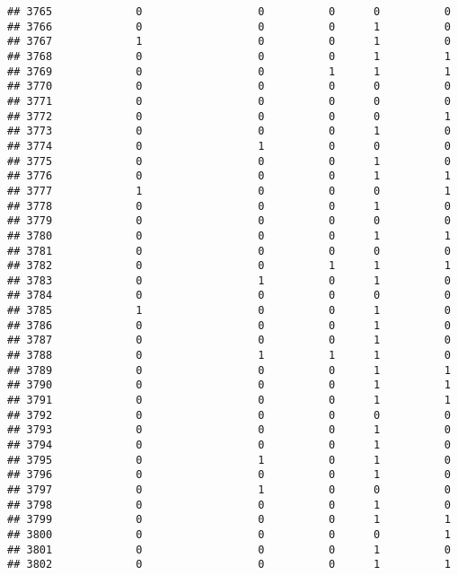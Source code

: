 \documentclass[
]{article}
\begin{document}
\begin{verbatim}
## 3765             0                  0          0      0          0
## 3766             0                  0          0      1          0
## 3767             1                  0          0      1          0
## 3768             0                  0          0      1          1
## 3769             0                  0          1      1          1
## 3770             0                  0          0      0          0
## 3771             0                  0          0      0          0
## 3772             0                  0          0      0          1
## 3773             0                  0          0      1          0
## 3774             0                  1          0      0          0
## 3775             0                  0          0      1          0
## 3776             0                  0          0      1          1
## 3777             1                  0          0      0          1
## 3778             0                  0          0      1          0
## 3779             0                  0          0      0          0
## 3780             0                  0          0      1          1
## 3781             0                  0          0      0          0
## 3782             0                  0          1      1          1
## 3783             0                  1          0      1          0
## 3784             0                  0          0      0          0
## 3785             1                  0          0      1          0
## 3786             0                  0          0      1          0
## 3787             0                  0          0      1          0
## 3788             0                  1          1      1          0
## 3789             0                  0          0      1          1
## 3790             0                  0          0      1          1
## 3791             0                  0          0      1          1
## 3792             0                  0          0      0          0
## 3793             0                  0          0      1          0
## 3794             0                  0          0      1          0
## 3795             0                  1          0      1          0
## 3796             0                  0          0      1          0
## 3797             0                  1          0      0          0
## 3798             0                  0          0      1          0
## 3799             0                  0          0      1          1
## 3800             0                  0          0      0          1
## 3801             0                  0          0      1          0
## 3802             0                  0          0      1          1

\end{verbatim}
\end{document}
